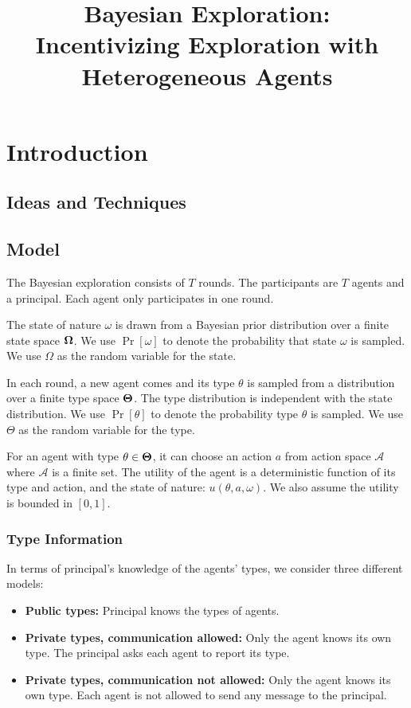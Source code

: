 \documentclass[11pt]{article}
\title{Bayesian Exploration:\\ Incentivizing Exploration with Heterogeneous Agents}
\author{
}
\def\A{\mathcal{A}}
\def\varTheta{\bold{\Theta}}
\def\varOmega{\bold{\Omega}}
\begin{document}
\maketitle

\section{Introduction}

\subsection{Ideas and Techniques}


\subsection{Model}
The Bayesian exploration consists of $T$ rounds. The participants are $T$ agents and a principal. Each agent only participates in one round.

The state of nature $\omega$ is drawn from a Bayesian prior distribution over a finite state space $\varOmega$. We use $\Pr[\omega]$ to denote the probability that state $\omega$ is sampled. We use $\Omega$ as the random variable for the state.

In each round, a new agent comes and its type $\theta$ is sampled from a distribution over a finite type space $\varTheta$. The type distribution is independent with the state distribution. We use $\Pr[\theta]$ to denote the probability type $\theta$ is sampled. We use $\Theta$ as the random variable for the type.

For an agent with type $\theta \in \varTheta$, it can choose an action $a$ from action space $\A$ where $\A$ is a finite set. The utility of the agent is a deterministic function of its type and action, and the state of nature: $u(\theta, a, \omega)$. We also assume the utility is bounded in $[0,1]$.

\subsubsection{Type Information}
In terms of principal's knowledge of the agents' types, we consider three different models:
\begin{itemize}
\item \textbf{Public types:} Principal knows the types of agents.
\item \textbf{Private types, communication allowed:} Only the agent knows its own type. The principal asks each agent to report its type.
\item \textbf{Private types, communication not allowed:}  Only the agent knows its own type. Each agent is not allowed to send any message to the principal.
\end{itemize}












\appendix

\end{document}
